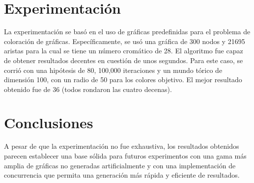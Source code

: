 \documentclass[a4paper]{report}
\begin{document}
\chapter{Experimentaci\'on}

La experimentaci\'on se bas\'o en el uso de gr\'aficas predefinidas para el problema
de coloraci\'on de gr\'aficas. Espec\'ificamente, se us\'o una gr\'afica de 300 nodos
y 21695 aristas para la cual se tiene un n\'umero crom\'atico de 28. El algoritmo fue
capaz de obtener resultados decentes en cuesti\'on de unos segundos. Para este caso,
se corri\'o con una hip\'otesis de 80, 100,000 iteraciones y un mundo t\'orico de
dimensi\'on 100, con un radio de 50 para los colores objetivo. El mejor resultado
obtenido fue de 36 (todos rondaron las cuatro decenas).

\chapter{Conclusiones}

A pesar de que la experimentaci\'on no fue exhaustiva, los resultados obtenidos parecen
establecer una base s\'olida para futuros experimentos con una gama m\'as amplia de
gr\'aficas no generadas artificialmente y con una implementaci\'on de concurrencia que
permita una generaci\'on m\'as r\'apida y eficiente de resultados.

{}

\end{document}
